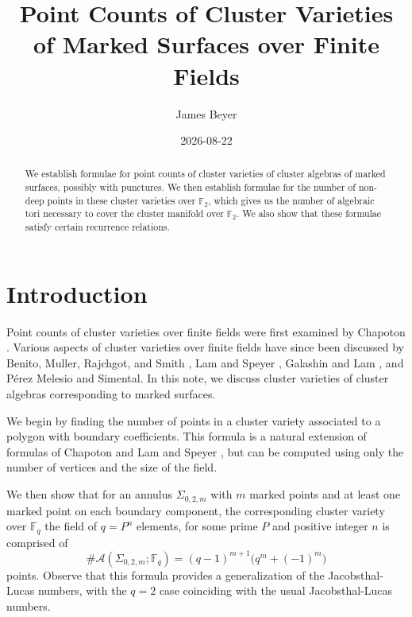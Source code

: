 \documentclass[reqno,12pt]{amsart}
\title{Point Counts of Cluster Varieties of Marked Surfaces over Finite Fields}
\author{James Beyer}
\date{2026-08-22}
\theoremstyle{definition}
\theoremstyle{remark}
\theoremstyle{remark}
\numberwithin{equation}{section}
\begin{document}
\begin{abstract}
	We establish formulae for point counts of cluster varieties of cluster algebras of marked surfaces, possibly with punctures. We then establish formulae for the number of non-deep points in these cluster varieties over $\mathbb{F}_2$, which gives us the number of algebraic tori necessary to cover the cluster manifold over $\mathbb{F}_2$. We also show that these formulae satisfy certain recurrence relations. 
\end{abstract}

\maketitle 

\tableofcontents

\section{Introduction}

Point counts of cluster varieties over finite fields were first examined by Chapoton \cite{Chap11, Chap15}. Various aspects of cluster varieties over finite fields have since been discussed by Benito, Muller, Rajchgot, and Smith \cite{BMRS15}, Lam and Speyer \cite{LS22}, Galashin and Lam \cite{GL24skein, GL24catalan}, and P{\'e}rez Melesio and Simental\cite{PMS26}. In this note, we discuss cluster varieties of cluster algebras corresponding to marked surfaces. 

We begin by finding the number of points in a cluster variety associated to a polygon with boundary coefficients. This formula is a natural extension of formulas of Chapoton \cite{Chap11} and Lam and Speyer \cite{LS23}, but can be computed using only the number of vertices and the size of the field.

We then show that for an annulus $\Sigma_{0,2,m}$ with $m$ marked points and at least one marked point on each boundary component, the corresponding cluster variety over $\mathbb{F}_q$ \textemdash the field of $q=P^n$ elements, for some prime $P$ and positive integer $n$ \textemdash is comprised of \[ \#\mathcal{A}(\Sigma_{0,2,m};\mathbb{F}_q) = (q-1)^{m+1} \big(q^{m} + (-1)^{m}\big) \] points. Observe that this formula provides a generalization of the Jacobsthal-Lucas numbers, with the $q=2$ case coinciding with the usual Jacobsthal-Lucas numbers. 
\end{document}
